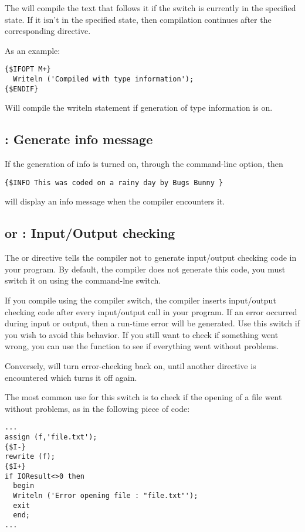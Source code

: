\documentclass{report}
\begin{document}
The  will compile the text that follows it if the
switch  is currently in the specified state.
If it isn't in the specified state, then compilation continues after the
corresponding  directive.

As an example:
\begin{verbatim}
{$IFOPT M+}
  Writeln ('Compiled with type information');
{$ENDIF}
\end{verbatim}
Will compile the writeln statement if generation of type information is on.

\subsection{ : Generate info message}

If the generation of info is turned on, through the  command-line
option, then 
\begin{verbatim}
{$INFO This was coded on a rainy day by Bugs Bunny }
\end{verbatim}
will display an info message when the compiler encounters it.


\subsection{ or  : Input/Output checking}
The  or  directive tells the compiler 
not to generate input/output checking code in your program. By default, the
compiler does not generate this code, you must switch it on using the
 command-lne switch.

If you compile using the  compiler switch, the \fpc compiler inserts input/output
checking code after every input/output call in your program. If an error
occurred during input or output, then a run-time error will be generated.
Use this switch if you wish to avoid this behavior.
If you still want to check if something went wrong, you can use the
 function to see if everything went without problems.

Conversely,  will turn error-checking back on, until another
directive is encountered which turns it off again.

The most common use for this switch is to check if the opening of a file
went without problems, as in the following piece of code:
\begin{verbatim}
...
assign (f,'file.txt');
{$I-}
rewrite (f);
{$I+}
if IOResult<>0 then
  begin
  Writeln ('Error opening file : "file.txt"');
  exit
  end;
...
\end{verbatim}
\end{document}
